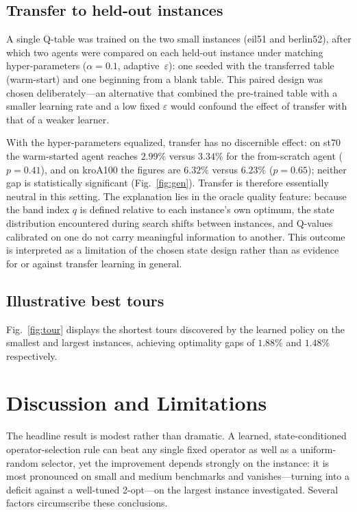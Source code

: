 \documentclass[10pt,twocolumn]{article}
\begin{document}
\subsection{Transfer to held-out instances}\label{sec:transfer}
A single Q-table was trained on the two small instances (eil51 and berlin52),
after which two agents were compared on each held-out instance under matching
hyper-parameters ($\alpha=0.1$, adaptive~$\varepsilon$): one seeded with the
transferred table (warm-start) and one beginning from a blank table. This
paired design was chosen deliberately---an alternative that combined the
pre-trained table with a smaller learning rate and a low fixed $\varepsilon$
would confound the effect of transfer with that of a weaker learner.

With the hyper-parameters equalized, transfer has no discernible effect: on
st70 the warm-started agent reaches $2.99\%$ versus $3.34\%$ for the
from-scratch agent ($p=0.41$), and on kroA100 the figures are $6.32\%$ versus
$6.23\%$ ($p=0.65$); neither gap is statistically significant
(Fig.~\ref{fig:gen}). Transfer is therefore essentially neutral in this
setting. The explanation lies in the oracle quality feature: because the band
index $q$ is defined relative to each instance's own optimum, the state
distribution encountered during search shifts between instances, and Q-values
calibrated on one do not carry meaningful information to another. This outcome
is interpreted as a limitation of the chosen state design rather than as
evidence for or against transfer learning in general.

\subsection{Illustrative best tours}
Fig.~\ref{fig:tour} displays the shortest tours discovered by the learned
policy on the smallest and largest instances, achieving optimality gaps of
$1.88\%$ and $1.48\%$ respectively.

\section{Discussion and Limitations}\label{sec:discussion}
The headline result is modest rather than dramatic. A learned, state-conditioned
operator-selection rule can beat any single fixed operator as well as a
uniform-random selector, yet the improvement depends strongly on the instance:
it is most pronounced on small and medium benchmarks and vanishes---turning
into a deficit against a well-tuned 2-opt---on the largest instance
investigated. Several factors circumscribe these conclusions.
\end{document}
